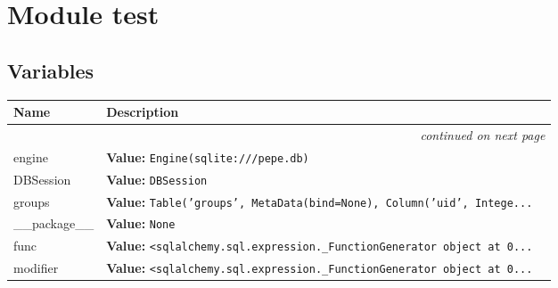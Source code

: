 %
%
%


\section{Module test}

    \label{test}


  \subsection{Variables}

    \vspace{-1cm}
\hspace{\varindent}\begin{longtable}{|p{\varnamewidth}|p{\vardescrwidth}|l}
\cline{1-2}
\cline{1-2} \centering \textbf{Name} & \centering \textbf{Description}& \\
\cline{1-2}
\endhead\cline{1-2}\multicolumn{3}{r}{\small\textit{continued on next page}}\\\endfoot\cline{1-2}
\endlastfoot\raggedright e\-n\-g\-i\-n\-e\- & \raggedright \textbf{Value:} 
{\tt Engine(sqlite:///pepe.db)}&\\
\cline{1-2}
\raggedright D\-B\-S\-e\-s\-s\-i\-o\-n\- & \raggedright \textbf{Value:} 
{\tt DBSession}&\\
\cline{1-2}
\raggedright g\-r\-o\-u\-p\-s\- & \raggedright \textbf{Value:} 
{\tt Table('groups', MetaData(bind=None), Column('uid', Intege\texttt{...}}&\\
\cline{1-2}
\raggedright \_\-\_\-p\-a\-c\-k\-a\-g\-e\-\_\-\_\- & \raggedright \textbf{Value:} 
{\tt None}&\\
\cline{1-2}
\raggedright f\-u\-n\-c\- & \raggedright \textbf{Value:} 
{\tt {\textless}sqlalchemy.sql.expression.\_FunctionGenerator object at 0\texttt{...}}&\\
\cline{1-2}
\raggedright m\-o\-d\-i\-f\-i\-e\-r\- & \raggedright \textbf{Value:} 
{\tt {\textless}sqlalchemy.sql.expression.\_FunctionGenerator object at 0\texttt{...}}&\\
\cline{1-2}
\end{longtable}


